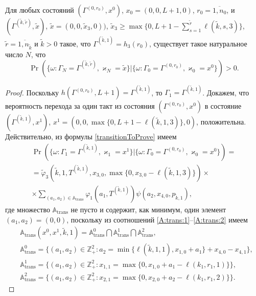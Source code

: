 \documentclass[a4paper,12pt,russian]{extarticle}
\begin{document}
\begin{lemma}\label{incycle:states}
Для любых состояний $(\Gamma^{(0,r_0)},x^0)$, $x_0=(0,0,L+1,0)$, $r_0=\overline{1,n_0}$, и
$(\Gamma^{(\tilde{k},\tilde{r})},\tilde{x})$,
$\tilde{x}=(0,0,\tilde{x}_3,0))$, $\tilde{x}_3\geqslant\max{\{0,L+1-\sum_{s=1}^{\tilde{r}} \ell(\tilde{k},s,3)\}}$,
$\tilde{r} = \overline{1,n_{\tilde{k}}}$ 
и $\tilde{k}>0$ такое, что 
$\Gamma^{(\tilde{k},1)}=h_3(r_0)$, существует такое натуральное число $N$, что 
\begin{equation*}
\Pr(\{\omega\colon \Gamma_{N}=\Gamma^{(\tilde{k},\tilde{r} )}, \varkappa_{N}=\tilde{x}\}|\{\omega\colon 
\Gamma_{0}=\Gamma^{(0,r_0)}, \varkappa_{0}=x^0\})>0.
\end{equation*}
\end{lemma}
\begin{proof}
Поскольку $h(\Gamma^{(0,r_0)}, L+1) = \Gamma^{(\tilde{k},1)}$, то $\Gamma_1 = \Gamma^{(\tilde{k},1)}$. Докажем, что вероятность перехода за один такт из состояния $(\Gamma^{(0,r_0)},x^0)$ в состояние $(\Gamma^{(\tilde{k},1)},x^1)$, $x^1 = (0,0,\max{\{0,L+1-\ell(\tilde{k},1,3)\}},0)$, положительна.
Действительно, из формулы \eqref{transitionToProve} имеем
\begin{multline*}
\Pr(\{\omega\colon \Gamma_{1}=\Gamma^{(\tilde{k},1)}, \varkappa_{1}=x^1\}|\{\omega\colon 
\Gamma_{0}=\Gamma^{(0,r_0)}, \varkappa_{0}=x^0\})=\\
=\widetilde{\varphi}_3(\tilde{k},1,T^{(\tilde{k},1)},x_{3,0},\max{\{0,x_{3,0} - \ell(\tilde{k},1,3)\}}) \times \\ \times
\sum_{(a_1,a_2)\in {\mathbb A}_{\mathrm{trans}}}\varphi_1(a_1,T^{(\tilde{k},1)})  \psi(a_2,x_{4,0}, p_{\tilde{k},1}),
\end{multline*}
где множество ${\mathbb A}_{\mathrm{trans}}$ не пусто и содержит, как минимум, один элемент $(a_1,a_2)=(0,0)$, поскольку из соотношений \eqref{A:trans:1}--\eqref{A:trans:2} имеем
\begin{align*}
&{\mathbb A}_{\mathrm{trans}}(x^0,x^1,\tilde{k},1) = {\mathbb A}_{\mathrm{trans}}^0 \bigcap {\mathbb A}_{\mathrm{trans}}^1\bigcap {\mathbb A}_{\mathrm{trans}}^2,\\
&{\mathbb A}_{\mathrm{trans}}^0 = \{(a_1,a_2) \in \mathbb{Z}_+^2 \colon a_2 = \min{\{\ell(\tilde{k},1,1), x_{1,0}+a_1}\} +x_{4,0}- x_{4,1}\},\\
&{\mathbb A}_{\mathrm{trans}}^1 = \{(a_1,a_2) \in \mathbb{Z}_+^2 \colon x_{1,1}=\max{\{0,x_{1,0}+a_1-\ell(k_1,r_1,1)\}}\},\\
& {\mathbb A}_{\mathrm{trans}}^2 = \{(a_1,a_2) \in \mathbb{Z}_+^2 \colon  x_{2,1} =\max{\{0,x_{2,0}+a_2-\ell(k_1,r_1,2)\}}\}.

\end{align*}
\end{proof}
\end{document}
